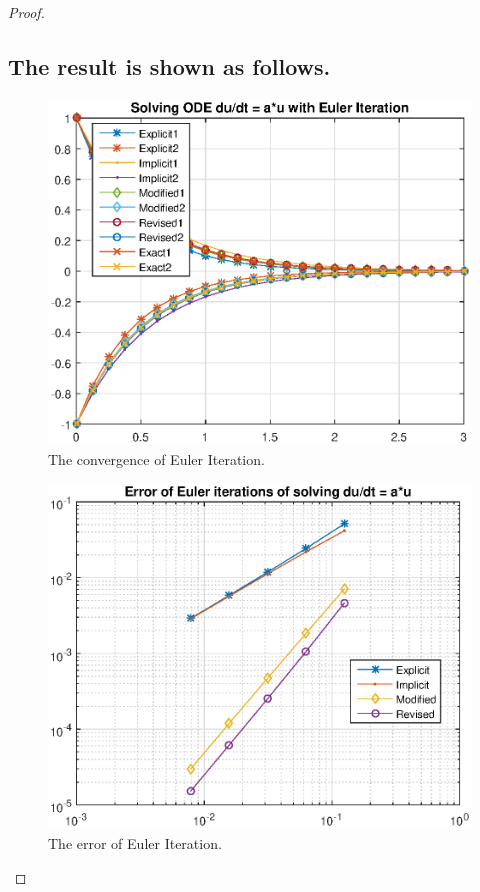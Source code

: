 \documentclass{article}
\begin{document}
\begin{proof}
\subsection{The result is shown as follows.}
\begin{figure}[htbp]
\centering
\includegraphics[width = 15cm]{converge.eps}
\caption{The convergence of Euler Iteration.}
\label{Convergence}
\end{figure}
\begin{figure}[htbp]
\centering
\includegraphics[width = 15cm]{error_list.eps}
\caption{The error of Euler Iteration.}
\label{Error}
\end{figure}
\end{proof}
\end{document}
